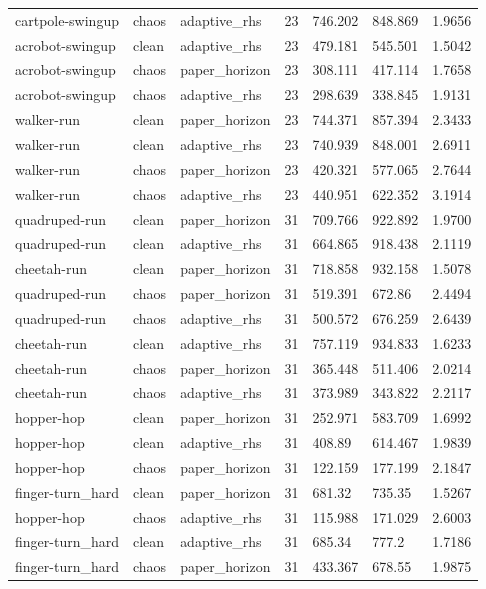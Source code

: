 \begin{tabular}{lllllll}
cartpole-swingup & chaos & adaptive\_rhs & 23 & 746.202 & 848.869 & 1.9656 \\
acrobot-swingup & clean & adaptive\_rhs & 23 & 479.181 & 545.501 & 1.5042 \\
acrobot-swingup & chaos & paper\_horizon & 23 & 308.111 & 417.114 & 1.7658 \\
acrobot-swingup & chaos & adaptive\_rhs & 23 & 298.639 & 338.845 & 1.9131 \\
walker-run & clean & paper\_horizon & 23 & 744.371 & 857.394 & 2.3433 \\
walker-run & clean & adaptive\_rhs & 23 & 740.939 & 848.001 & 2.6911 \\
walker-run & chaos & paper\_horizon & 23 & 420.321 & 577.065 & 2.7644 \\
walker-run & chaos & adaptive\_rhs & 23 & 440.951 & 622.352 & 3.1914 \\
quadruped-run & clean & paper\_horizon & 31 & 709.766 & 922.892 & 1.9700 \\
quadruped-run & clean & adaptive\_rhs & 31 & 664.865 & 918.438 & 2.1119 \\
cheetah-run & clean & paper\_horizon & 31 & 718.858 & 932.158 & 1.5078 \\
quadruped-run & chaos & paper\_horizon & 31 & 519.391 & 672.86 & 2.4494 \\
quadruped-run & chaos & adaptive\_rhs & 31 & 500.572 & 676.259 & 2.6439 \\
cheetah-run & clean & adaptive\_rhs & 31 & 757.119 & 934.833 & 1.6233 \\
cheetah-run & chaos & paper\_horizon & 31 & 365.448 & 511.406 & 2.0214 \\
cheetah-run & chaos & adaptive\_rhs & 31 & 373.989 & 343.822 & 2.2117 \\
hopper-hop & clean & paper\_horizon & 31 & 252.971 & 583.709 & 1.6992 \\
hopper-hop & clean & adaptive\_rhs & 31 & 408.89 & 614.467 & 1.9839 \\
hopper-hop & chaos & paper\_horizon & 31 & 122.159 & 177.199 & 2.1847 \\
finger-turn\_hard & clean & paper\_horizon & 31 & 681.32 & 735.35 & 1.5267 \\
hopper-hop & chaos & adaptive\_rhs & 31 & 115.988 & 171.029 & 2.6003 \\
finger-turn\_hard & clean & adaptive\_rhs & 31 & 685.34 & 777.2 & 1.7186 \\
finger-turn\_hard & chaos & paper\_horizon & 31 & 433.367 & 678.55 & 1.9875 \\

\end{tabular}
